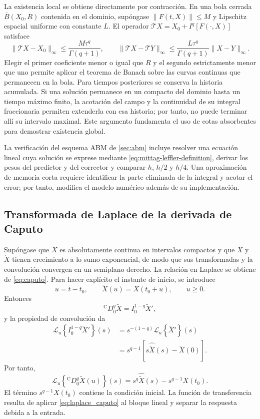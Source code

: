 La existencia local se obtiene directamente por contracción. En una bola
cerrada $\overline B(X_0,R)$ contenida en el dominio, supóngase
$\|F(t,X)\|\le M$ y Lipschitz espacial uniforme con constante $L$.
El operador $\mathcal TX=X_0+I^q[F(\cdot,X)]$ satisface
\[
 \|\mathcal TX-X_0\|_\infty\le\frac{M\tau^q}{\Gamma(q+1)},
 \qquad
 \|\mathcal TX-\mathcal TY\|_\infty
 \le\frac{L\tau^q}{\Gamma(q+1)}\|X-Y\|_\infty.
\]
Elegir el primer coeficiente menor o igual que $R$ y el segundo estrictamente
menor que uno permite aplicar el teorema de Banach sobre las curvas continuas
que permanecen en la bola. Para tiempos posteriores se conserva la historia
acumulada. Si una solución permanece en un compacto del dominio hasta un
tiempo máximo finito, la acotación del campo y la continuidad de su integral
fraccionaria permiten extenderla con esa historia; por tanto, no puede
terminar allí su intervalo maximal. Este argumento fundamenta el uso de
cotas absorbentes para demostrar existencia global.

La verificación del esquema ABM de \cref{sec:abm} incluye resolver una ecuación
lineal cuya solución se exprese mediante
\cref{eq:mittag-leffler-definition}, derivar los pesos del predictor y del
corrector y comparar \(h\), \(h/2\) y \(h/4\). Una aproximación de memoria
corta requiere identificar la parte eliminada de la integral y acotar el error;
por tanto, modifica el modelo numérico además de su implementación.

\subsection{Transformada de Laplace de la derivada de Caputo}

Supóngase que \(X\) es absolutamente continua en intervalos compactos y
que \(X\) y \(\dot X\) tienen crecimiento a lo sumo exponencial, de modo
que sus transformadas y la convolución convergen en un semiplano derecho.
La relación en Laplace se obtiene de \cref{eq:caputo}. Para hacer
explícito el instante de inicio, se introduce
\[
u=t-t_0,\qquad \widetilde X(u)=X(t_0+u),\qquad u\geq0.
\]
Entonces
\[
{}^{\mathrm C}D_{0}^{q}\widetilde X
=I_0^{1-q}\widetilde X',
\]
y la propiedad de convolución da
\begin{align}
\mathcal L_u\!\left\{I_0^{1-q}\widetilde X'\right\}(s)
&=s^{-(1-q)}
\mathcal L_u\!\left\{\widetilde X'\right\}(s)\nonumber\\
&=s^{q-1}\left[s\widehat{\widetilde X}(s)-\widetilde X(0)\right].
\end{align}
Por tanto,
\begin{equation}
\boxed{
\mathcal L_u\!\left\{{}^{\mathrm C}D_0^q\widetilde X(u)\right\}(s)
=s^q\widehat{\widetilde X}(s)-s^{q-1}X(t_0).
}
\label{eq:laplace_caputo}
\end{equation}
El término \(s^{q-1}X(t_0)\) contiene la condición inicial. La función de
transferencia resulta de aplicar
\cref{eq:laplace_caputo} al bloque lineal y separar la respuesta debida a la
entrada.

